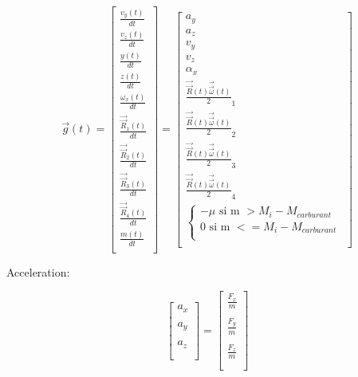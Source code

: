 \documentclass{article}
\begin{document}
\begin{equation}
\vec{g}(t) = 
\begin{bmatrix}
    \frac{v_y(t)}{dt} \\
    \frac{v_z(t)}{dt} \\
    \frac{y(t)}{dt} \\
    \frac{z(t)}{dt} \\
    \frac{\omega_x(t)}{dt} \\
    \frac{\vec{\vec{R}}_1(t)}{dt} \\
    \frac{\vec{\vec{R}}_2(t)}{dt} \\
    \frac{\vec{\vec{R}}_3(t)}{dt} \\
    \frac{\vec{\vec{R}}_4(t)}{dt} \\
    \frac{m(t)}{dt} \\
\end{bmatrix}
=
\begin{bmatrix}
    a_y \\
    a_z \\
    v_y \\
    v_z \\
    \alpha_x \\
    \frac{\vec{\vec{R}}(t)\vec{\vec{\omega}}(t)}{2}_1 \\
    \frac{\vec{\vec{R}}(t)\vec{\vec{\omega}}(t)}{2}_2 \\
    \frac{\vec{\vec{R}}(t)\vec{\vec{\omega}}(t)}{2}_3 \\
    \frac{\vec{\vec{R}}(t)\vec{\vec{\omega}}(t)}{2}_4 \\
    \begin{cases}
        -\mu \text{ si m } > M_i - M_{carburant}\\
        0 \text{ si m } <= M_i - M_{carburant}\\
    \end{cases} \\
\end{bmatrix}
\end{equation}

Acceleration:

\begin{equation}
    \begin{bmatrix}
        a_x \\ \\
        a_y \\ \\
        a_z \\ \\
    \end{bmatrix}
=
\begin{bmatrix}
    \frac{F_x}{m} \\ \\
    \frac{F_y}{m} \\ \\
    \frac{F_z}{m} \\ \\
\end{bmatrix}
\end{equation}
\end{document}

